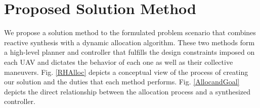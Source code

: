 \documentclass{ieeeaccess}
\begin{document}



\section{Proposed Solution Method}
We propose a solution method to the formulated problem scenario that combines reactive synthesis with a dynamic allocation algorithm. These two methods form a high-level planner and controller that fulfills the design constraints imposed on each UAV and dictates the behavior of each one as well as their collective maneuvers. Fig. \ref{RHAlloc} depicts a conceptual view of the process of creating our solution and the duties that each method performs. Fig. \ref{AllocandGoal} depicts the direct relationship between the allocation process and a synthesized controller.
\end{document}
